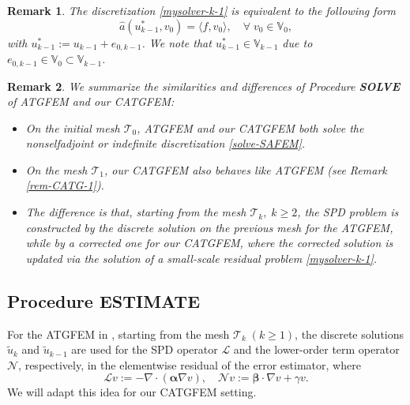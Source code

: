 \documentclass[preprint,times]{elsarticle}%
\newtheorem{remark}{Remark}[section]
\numberwithin{algorithm}{section}
\numberwithin{equation}{section}
\newcommand{\valpha}{\boldsymbol{\alpha}}
\newcommand{\vbeta}{\boldsymbol{\beta}}
\newcommand{\ha}{\hat{a}}
\newcommand{\tu}{\tilde{u}}
\newcommand{\mcL}{\mathcal{L}}
\newcommand{\mcN}{\mathcal{N}}
\newcommand{\mcT}{\mathcal{T}}
\newcommand{\mbV}{\mathbb{V}}
\def\geq{\geqslant}
\begin{document}
\begin{remark}The discretization \eqref{mysolver-k-1} is equivalent to the following form
\begin{equation}\label{mysolver-k-1-equivalence}
	\ha(u_{k-1}^*,v_0) = \langle f, v_0 \rangle, \quad \forall \; v_0 \in \mbV_0, 
\end{equation}
with $u_{k-1}^* := u_{k-1} + e_{0,k-1}$. We note that $u_{k-1}^* \in \mbV_{k-1}$ due to $e_{0,k-1} \in \mbV_0 \subset \mbV_{k-1}$. 
\end{remark}


\begin{remark}\label{rem-solve-difference}
We summarize the similarities and differences of Procedure \textbf{SOLVE} of ATGFEM and our CATGFEM: 
\begin{itemize}
	\itemsep = 0pt \parskip = 0pt
	\item On the initial mesh $\mcT_0$, ATGFEM and our CATGFEM both solve the nonselfadjoint or indefinite discretization \eqref{solve-SAFEM}. 
	\item On the mesh $\mcT_1$, our CATGFEM also behaves like ATGFEM (see Remark \ref{rem-CATG-1}). 
	\item The difference is that, starting from the mesh $\mcT_k,\; k \geq 2$, the SPD problem is constructed by the discrete solution on the previous mesh for the ATGFEM, while by a corrected one for our CATGFEM, where the corrected solution is updated via the solution of a small-scale residual problem \eqref{mysolver-k-1}. 
\end{itemize}
\end{remark}


\subsection{Procedure \textbf{ESTIMATE}}
For the ATGFEM in \cite{LiYkZhangY21:A908}, starting from the mesh $\mcT_k \; (k \geq 1)$, the discrete solutions $\tu_k$ and $\tu_{k-1}$ are used for the SPD operator $\mcL$ and the lower-order term operator $\mcN$, respectively, in the elementwise residual of the error estimator, where 
\begin{equation*}
	\mcL v := -\nabla \cdot (\valpha \nabla v), \quad \mcN v:= \vbeta \cdot \nabla v + \gamma v. 
\end{equation*}
We will adapt this idea for our CATGFEM setting. 
\end{document}
